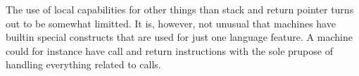 \documentclass[acmsmall,review]{acmart}\settopmatter{printfolios=true}
\begin{document}
The use of local capabilities for other things than stack and return pointer
turns out to be somewhat limitted. It is, however, not unusual that machines
have builtin special constructs that are used for just one language feature. A
machine could for instance have call and return instructions with the sole
prupose of handling everything related to calls.
\\\\
\end{document}
